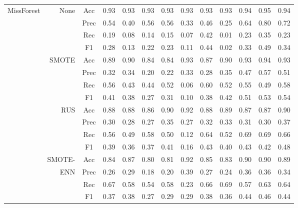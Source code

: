 \begin{table*}
\begin{narrow}{-1cm}{-1cm}
\begin{subtable}[t]{2\columnwidth}
\begin{tabular}{l|r|c|cccccccccc}
        
        MissForest & None & Acc & 0.93 & 0.93 & 0.93 & 0.93 & 0.93 & 0.93 & 0.93 & 0.94 & 0.95 & 0.94 \\
        ~ & ~ & Prec & 0.54 & 0.40 & 0.56 & 0.56 & 0.33 & 0.46 & 0.25 & 0.64 & 0.80 & 0.72 \\
        ~ & ~ & Rec & 0.19 & 0.08 & 0.14 & 0.15 & 0.07 & 0.42 & 0.01 & 0.23 & 0.35 & 0.23 \\
        ~ & ~ & F1 & 0.28 & 0.13 & 0.22 & 0.23 & 0.11 & 0.44 & 0.02 & 0.33 & 0.49 & 0.34 \\
        \cline{2-13}
        ~ & SMOTE & Acc & 0.89 & 0.90 & 0.84 & 0.84 & 0.93 & 0.87 & 0.90 & 0.93 & 0.94 & 0.93 \\
        ~ & ~ & Prec & 0.32 & 0.34 & 0.20 & 0.22 & 0.33 & 0.28 & 0.35 & 0.47 & 0.57 & 0.51 \\
        ~ & ~ & Rec & 0.56 & 0.43 & 0.44 & 0.52 & 0.06 & 0.60 & 0.52 & 0.55 & 0.49 & 0.58 \\
        ~ & ~ & F1 & 0.41 & 0.38 & 0.27 & 0.31 & 0.10 & 0.38 & 0.42 & 0.51 & 0.53 & 0.54 \\
        \cline{2-13}
        ~ & RUS & Acc & 0.88 & 0.88 & 0.86 & 0.90 & 0.92 & 0.88 & 0.89 & 0.87 & 0.87 & 0.90 \\
        ~ & ~ & Prec & 0.30 & 0.28 & 0.27 & 0.35 & 0.27 & 0.32 & 0.33 & 0.31 & 0.30 & 0.37 \\
        ~ & ~ & Rec & 0.56 & 0.49 & 0.58 & 0.50 & 0.12 & 0.64 & 0.52 & 0.69 & 0.69 & 0.66 \\
        ~ & ~ & F1 & 0.39 & 0.36 & 0.37 & 0.41 & 0.16 & 0.43 & 0.40 & 0.43 & 0.42 & 0.48 \\
        \cline{2-13}
        ~ & SMOTE- & Acc & 0.84 & 0.87 & 0.80 & 0.81 & 0.92 & 0.85 & 0.83 & 0.90 & 0.90 & 0.89 \\
        ~ & ENN & Prec & 0.26 & 0.29 & 0.18 & 0.20 & 0.39 & 0.27 & 0.24 & 0.36 & 0.36 & 0.34 \\
        ~ & ~ & Rec & 0.67 & 0.58 & 0.54 & 0.58 & 0.23 & 0.66 & 0.69 & 0.57 & 0.63 & 0.64 \\
        ~ & ~ & F1 & 0.37 & 0.38 & 0.27 & 0.29 & 0.29 & 0.38 & 0.36 & 0.44 & 0.46 & 0.44 \\
        \hline\hline
        

\end{tabular}
\end{subtable}
\end{narrow}
\end{table*}

